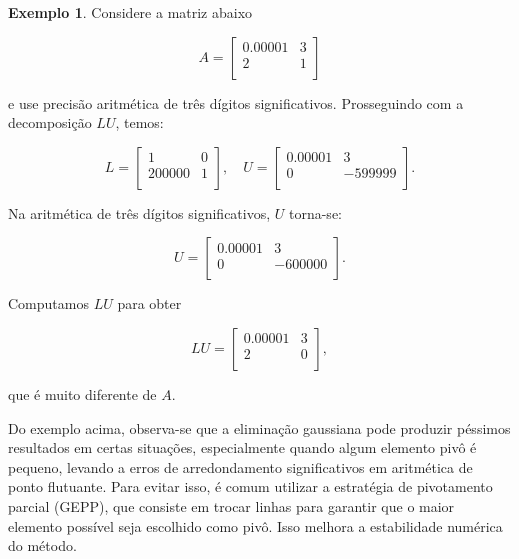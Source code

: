 \documentclass{article}
\theoremstyle{plain}
\theoremstyle{definition}
\newtheorem{exmp}[defn]{Exemplo}
\theoremstyle{remark}
\begin{document}
\begin{exmp}\label{ex:piv_parcial}
  Considere a matriz abaixo

\begin{equation*}
  A = \begin{bmatrix}
    0.00001 & 3 \\
    2 & 1 \\
    \end{bmatrix}
\end{equation*}

\noindent e use precisão aritmética de três dígitos significativos. Prosseguindo com a decomposição \(LU\), temos:

\begin{equation*}
  L = \begin{bmatrix}
    1 & 0 \\
    200000 & 1 \\
    \end{bmatrix}, \quad
  U = \begin{bmatrix}
    0.00001 & 3 \\
    0 & -599999 \\
    \end{bmatrix}.
\end{equation*}

Na aritmética de três dígitos significativos, \(U\) torna-se:

\begin{equation*}
  U = \begin{bmatrix}
    0.00001 & 3 \\
    0 & -600000 \\
    \end{bmatrix}.
\end{equation*}

Computamos \(LU\) para obter 

\begin{equation*}
  LU = \begin{bmatrix}
    0.00001 & 3 \\
    2 & 0 \\
    \end{bmatrix},
\end{equation*}

\noindent que é muito diferente de \(A\).
\end{exmp}

Do exemplo acima, observa-se que a eliminação gaussiana pode produzir péssimos resultados em certas situações, especialmente quando algum elemento pivô é pequeno, levando a erros de arredondamento significativos em aritmética de ponto flutuante. Para evitar isso, é comum utilizar a estratégia de pivotamento parcial (GEPP), que consiste em trocar linhas para garantir que o maior elemento possível seja escolhido como pivô. Isso melhora a estabilidade numérica do método.
\end{document}

